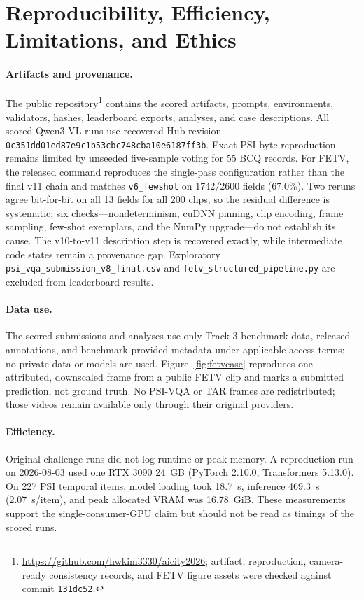 \documentclass[runningheads]{llncs}
\begin{document}
\section{Reproducibility, Efficiency, Limitations, and Ethics}
\paragraph{Artifacts and provenance.}
The public repository\footnote{\url{https://github.com/hwkim3330/aicity2026}; artifact, reproduction, camera-ready consistency records, and FETV figure assets were checked against commit \texttt{131dc52}.} contains the scored artifacts, prompts, environments, validators, hashes, leaderboard exports, analyses, and case descriptions. All scored Qwen3-VL runs use recovered Hub revision \texttt{0c351dd01ed87e9c1b53cbc748cba10e6187ff3b}. Exact PSI byte reproduction remains limited by unseeded five-sample voting for 55 BCQ records. For FETV, the released command reproduces the single-pass configuration rather than the final v11 chain and matches \texttt{v6\_fewshot} on 1742/2600 fields (67.0\%). Two reruns agree bit-for-bit on all 13 fields for all 200 clips, so the residual difference is systematic; six checks---nondeterminism, cuDNN pinning, clip encoding, frame sampling, few-shot exemplars, and the NumPy upgrade---do not establish its cause. The v10-to-v11 description step is recovered exactly, while intermediate code states remain a provenance gap. Exploratory \texttt{psi\_vqa\_submission\_v8\_final.csv} and \texttt{fetv\_structured\_pipeline.py} are excluded from leaderboard results.

\paragraph{Data use.}
The scored submissions and analyses use only Track 3 benchmark data, released annotations, and benchmark-provided metadata under applicable access terms; no private data or models are used. Figure~\ref{fig:fetvcase} reproduces one attributed, downscaled frame from a public FETV clip and marks a submitted prediction, not ground truth. No PSI-VQA or TAR frames are redistributed; those videos remain available only through their original providers.

\paragraph{Efficiency.}
Original challenge runs did not log runtime or peak memory. A reproduction run on 2026-08-03 used one RTX 3090 24~GB (PyTorch 2.10.0, Transformers 5.13.0). On 227 PSI temporal items, model loading took 18.7~s, inference 469.3~s (2.07~s/item), and peak allocated VRAM was 16.78~GiB. These measurements support the single-consumer-GPU claim but should not be read as timings of the scored runs.
\end{document}
